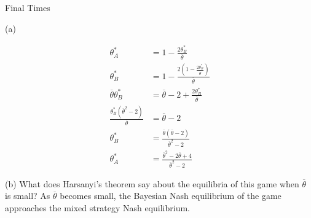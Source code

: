 \documentclass[8pt]{extarticle}
\begin{document}
\begin{problem}{Final Times}
\begin{problem}{(a)}
\begin{description}
\begin{align*}
            \theta_{A}^{\ast} &= 1-\frac{2\theta_{B}^{\ast}}{\overline{\theta}}\\
            \theta_{B}^{\ast} &= 1 - \frac{2\left(1 - \frac{2\theta_{B}^{\ast}}{\overline{\theta}}\right)}{\overline{\theta}}\\
            \overline{\theta}\theta_{B}^{\ast} &= \overline{\theta} - 2 + \frac{2\theta_{B}^{\ast}}{\overline{\theta}}\\
            \frac{ \theta_{B}^{\ast}\left(\overline{\theta}^2 - 2\right) }{ \overline{\theta} }&= \overline{\theta} - 2\\
            \theta_{B}^{\ast} &= \frac{\overline{\theta}\left(\overline{\theta} - 2\right)}{\overline{\theta}^2 - 2}\\
            \theta_{A}^{\ast} &= \frac{\overline{\theta}^{2}-2 \overline{\theta} + 4}{\overline{\theta}^{2} - 2}
          \end{align*}
      \end{description}
    \end{problem}
    \begin{problem}{(b)}
      What does Harsanyi's theorem say about the equilibria of this game when $\overline{\theta}$ is small?
      \tcblower
      As $\overline{\theta}$ becomes small, the Bayesian Nash equilibrium of the game approaches the mixed strategy Nash equilibrium.
    \end{problem}
  \end{problem}
\end{document}

